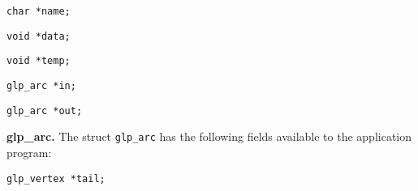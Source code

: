 \documentclass[dvipdfm,11pt]{report}
\begin{document}
\medskip

\noindent
\verb|char *name;|

\begin{comment}Symbolic name assigned to the vertex. It is a pointer to
a null terminated character string of length from 1 to 255 characters.
If no name is assigned to the vertex, this field contains \verb|NULL|.
\end{comment}

\medskip

\noindent
\verb|void *data;|

\begin{comment}Pointer to a data block associated with the vertex. This
data block is automatically allocated on creating a new vertex and freed
on deleting the vertex. If $v\_size=0$, the block is not allocated, and
this field contains \verb|NULL|.
\end{comment}

\medskip

\noindent
\verb|void *temp;|

\begin{comment}Working pointer, which may be used freely for any
purposes. The application program can change this field directly.
\end{comment}

\medskip

\noindent
\verb|glp_arc *in;|

\begin{comment}Pointer to the (unordered) list of incoming arcs. If the
vertex has no incoming arcs, this field contains \verb|NULL|.
\end{comment}

\medskip

\noindent
\verb|glp_arc *out;|

\begin{comment}Pointer to the (unordered) list of outgoing arcs. If the
vertex has no outgoing arcs, this field contains \verb|NULL|.
\end{comment}

\bigskip

\noindent
{\bf glp\_arc.} The struct \verb|glp_arc| has the following fields
available to the application program:

\medskip

\noindent
\verb|glp_vertex *tail;|

\begin{comment}Pointer to a vertex, which is tail endpoint of the arc.
\end{comment}
\end{document}
